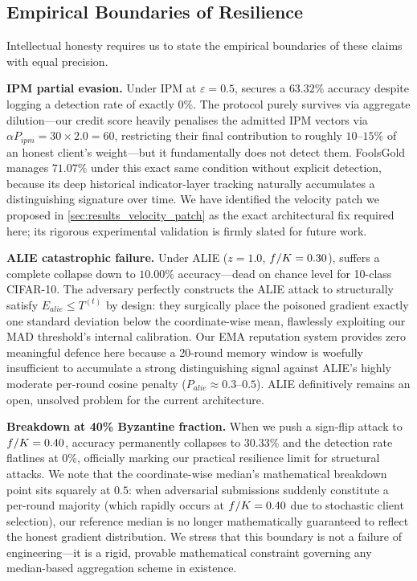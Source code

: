 \documentclass[../main.tex]{subfiles}
\begin{document}
\subsection{Empirical Boundaries of Resilience}
\label{sec:conclusion_boundaries}

Intellectual honesty requires us to state the empirical boundaries of these claims with equal precision.

\textbf{IPM partial evasion.}
Under IPM at $\varepsilon = 0.5$, \aegis{} secures a $63.32\%$ accuracy despite logging a detection rate of exactly $0\%$. The protocol purely survives via aggregate dilution---our credit score heavily penalises the admitted IPM vectors via $\alpha P_{ipm} = 30 \times 2.0 = 60$, restricting their final contribution to roughly $10$--$15\%$ of an honest client's weight---but it fundamentally does not detect them. FoolsGold manages $71.07\%$ under this exact same condition without explicit detection, because its deep historical indicator-layer tracking naturally accumulates a distinguishing signature over time. We have identified the velocity patch we proposed in \cref{sec:results_velocity_patch} as the exact architectural fix required here; its rigorous experimental validation is firmly slated for future work.

\textbf{ALIE catastrophic failure.}
Under ALIE ($z=1.0$, $f/K=0.30$), \aegis{} suffers a complete collapse down to $10.00\%$ accuracy---dead on chance level for 10-class CIFAR-10. The adversary perfectly constructs the ALIE attack to structurally satisfy $E_{alie} \leq T^{(t)}$ by design: they surgically place the poisoned gradient exactly one standard deviation below the coordinate-wise mean, flawlessly exploiting our MAD threshold's internal calibration. Our EMA reputation system provides zero meaningful defence here because a 20-round memory window is woefully insufficient to accumulate a strong distinguishing signal against ALIE's highly moderate per-round cosine penalty ($P_{alie} \approx 0.3$--$0.5$). ALIE definitively remains an open, unsolved problem for the current \aegis{} architecture.

\textbf{Breakdown at 40\% Byzantine fraction.}
When we push a sign-flip attack to $f/K = 0.40$, accuracy permanently collapses to $30.33\%$ and the detection rate flatlines at $0\%$, officially marking our practical resilience limit for structural attacks. We note that the coordinate-wise median's mathematical breakdown point sits squarely at $0.5$: when adversarial submissions suddenly constitute a per-round majority (which rapidly occurs at $f/K = 0.40$ due to stochastic client selection), our reference median is no longer mathematically guaranteed to reflect the honest gradient distribution. We stress that this boundary is not a failure of engineering---it is a rigid, provable mathematical constraint governing any median-based aggregation scheme in existence.
\end{document}
